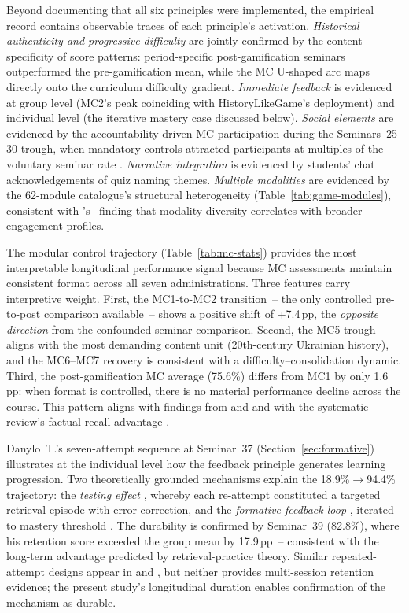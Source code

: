Beyond documenting that all six principles were implemented, the empirical record contains observable traces of each principle's activation. \textit{Historical authenticity and progressive difficulty} are jointly confirmed by the content-specificity of score patterns: period-specific post-gamification seminars outperformed the pre-gamification mean, while the MC U-shaped arc maps directly onto the curriculum difficulty gradient. \textit{Immediate feedback} is evidenced at group level (MC2's peak coinciding with HistoryLikeGame's deployment) and individual level (the iterative mastery case discussed below). \textit{Social elements} are evidenced by the accountability-driven MC participation during the Seminars~25--30 trough, when mandatory controls attracted participants at multiples of the voluntary seminar rate \cite{Sailer2017}. \textit{Narrative integration} is evidenced by students' chat acknowledgements of quiz naming themes. \textit{Multiple modalities} are evidenced by the 62-module catalogue's structural heterogeneity (Table~\ref{tab:game-modules}), consistent with \citeauthor{Qian2016}'s~\cite{Qian2016} finding that modality diversity correlates with broader engagement profiles.

The modular control trajectory (Table~\ref{tab:mc-stats}) provides the most interpretable longitudinal performance signal because MC assessments maintain consistent format across all seven administrations. Three features carry interpretive weight. First, the MC1-to-MC2 transition~-- the only controlled pre-to-post comparison available~-- shows a positive shift of +7.4\,pp, the \emph{opposite direction} from the confounded seminar comparison. Second, the MC5 trough aligns with the most demanding content unit (20th-century Ukrainian history), and the MC6--MC7 recovery is consistent with a difficulty--consolidation dynamic. Third, the post-gamification MC average (75.6\%) differs from MC1 by only 1.6\,pp: when format is controlled, there is no material performance decline across the course. This pattern aligns with findings from \cite{8Yu2014} and \cite{6Czerwinski2018} and with the systematic review's factual-recall advantage \cite{KorniienkoSemerikov2024}.

Danylo~T.'s seven-attempt sequence at Seminar~37 (Section~\ref{sec:formative}) illustrates at the individual level how the feedback principle generates learning progression. Two theoretically grounded mechanisms explain the 18.9\%$\to$94.4\% trajectory: the \emph{testing effect} \cite{RoedigerButler2011, Dunlosky2013}, whereby each re-attempt constituted a targeted retrieval episode with error correction, and the \emph{formative feedback loop} \cite{HattieTimperley2007}, iterated to mastery threshold \cite{Hattie2009}. The durability is confirmed by Seminar~39 (82.8\%), where his retention score exceeded the group mean by 17.9\,pp~-- consistent with the long-term advantage predicted by retrieval-practice theory. Similar repeated-attempt designs appear in \cite{5kazanidis2018alpha} and \cite{50Lye2013}, but neither provides multi-session retention evidence; the present study's longitudinal duration enables confirmation of the mechanism as durable.

